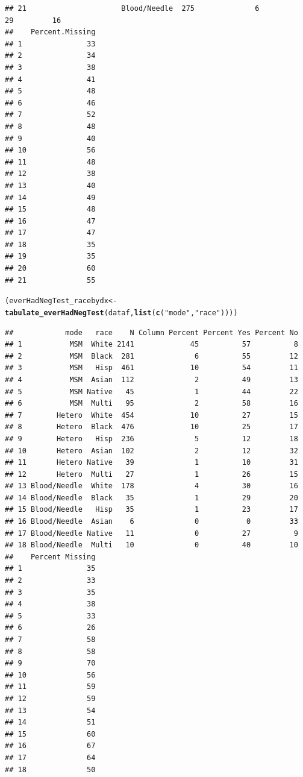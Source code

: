 \documentclass{article}\usepackage[]{graphicx}\usepackage[]{color}
\makeatletter
\newcommand{\hlstr}[1]{\textcolor[rgb]{0.192,0.494,0.8}{#1}}%
\newcommand{\hlstd}[1]{\textcolor[rgb]{0.345,0.345,0.345}{#1}}%
\newcommand{\hlkwb}[1]{\textcolor[rgb]{0.69,0.353,0.396}{#1}}%
\newcommand{\hlkwd}[1]{\textcolor[rgb]{0.737,0.353,0.396}{\textbf{#1}}}%
\newenvironment{kframe}{%
 \def\at@end@of@kframe{}%
 \ifinner\ifhmode%
  \def\at@end@of@kframe{\end{minipage}}%
  \begin{minipage}{\columnwidth}%
 \fi\fi%
 \def\FrameCommand##1{\hskip\@totalleftmargin \hskip-\fboxsep
 \colorbox{shadecolor}{##1}\hskip-\fboxsep
     \hskip-\linewidth \hskip-\@totalleftmargin \hskip\columnwidth}%
 \MakeFramed {\advance\hsize-\width
   \@totalleftmargin\z@ \linewidth\hsize
   \@setminipage}}%
 {\par\unskip\endMakeFramed%
 \at@end@of@kframe}
\newenvironment{knitrout}{}{} %
\makeatother
\begin{document}
\begin{knitrout}
\begin{kframe}
\begin{verbatim}
## 21                      Blood/Needle  275              6          29         16
##    Percent.Missing
## 1               33
## 2               34
## 3               38
## 4               41
## 5               48
## 6               46
## 7               52
## 8               48
## 9               40
## 10              56
## 11              48
## 12              38
## 13              40
## 14              49
## 15              48
## 16              47
## 17              47
## 18              35
## 19              35
## 20              60
## 21              55
\end{verbatim}
\begin{alltt}
\hlstd{(everHadNegTest_racebydx} \hlkwb{<-} \hlkwd{tabulate_everHadNegTest}\hlstd{(dataf,} \hlkwd{list}\hlstd{(}\hlkwd{c}\hlstd{(}\hlstr{"mode"}\hlstd{,} \hlstr{"race"}\hlstd{))))}
\end{alltt}
\begin{verbatim}
##            mode   race    N Column Percent Percent Yes Percent No
## 1           MSM  White 2141             45          57          8
## 2           MSM  Black  281              6          55         12
## 3           MSM   Hisp  461             10          54         11
## 4           MSM  Asian  112              2          49         13
## 5           MSM Native   45              1          44         22
## 6           MSM  Multi   95              2          58         16
## 7        Hetero  White  454             10          27         15
## 8        Hetero  Black  476             10          25         17
## 9        Hetero   Hisp  236              5          12         18
## 10       Hetero  Asian  102              2          12         32
## 11       Hetero Native   39              1          10         31
## 12       Hetero  Multi   27              1          26         15
## 13 Blood/Needle  White  178              4          30         16
## 14 Blood/Needle  Black   35              1          29         20
## 15 Blood/Needle   Hisp   35              1          23         17
## 16 Blood/Needle  Asian    6              0           0         33
## 17 Blood/Needle Native   11              0          27          9
## 18 Blood/Needle  Multi   10              0          40         10
##    Percent Missing
## 1               35
## 2               33
## 3               35
## 4               38
## 5               33
## 6               26
## 7               58
## 8               58
## 9               70
## 10              56
## 11              59
## 12              59
## 13              54
## 14              51
## 15              60
## 16              67
## 17              64
## 18              50
\end{verbatim}
\end{kframe}
\end{knitrout}
\end{document}
